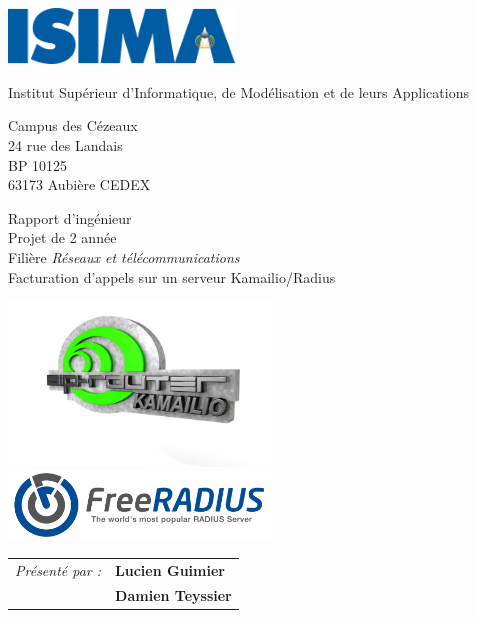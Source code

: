 \thispagestyle{empty}

\includegraphics[width=6cm]{images/isima.png}

\vspace{0.5cm}

\begin{minipage}{4cm}
\begin{flushleft}
	Institut Supérieur d’Informatique, de Modélisation et de leurs Applications
	
	\vspace{0.5cm}
	
	\small{ Campus des Cézeaux \\ 24 rue des Landais \\ BP 10125 \\ 63173 Aubière CEDEX }
\end{flushleft}
\end{minipage}

\vspace{2cm}

\begin{center}
	Rapport d’ingénieur \\
	Projet de 2{\ieme} année \\
	Filière {\em{Réseaux et télécommunications}} \\
	\Large{Facturation d’appels sur un serveur Kamailio/Radius}
\end{center}

\vspace{1cm}

\begin{center}
\includegraphics[width=7cm, valign=m]{images/logo-kamailio.jpg}
\includegraphics[width=7cm, valign=m]{images/logo-freeradius.png}
\end{center}

\vspace{1cm}

\large{
\begin{tabular}{ll}
\textit{Présenté par :} & \textbf{Lucien Guimier} \\
& \textbf{Damien Teyssier}
\end{tabular}
}

\todo
